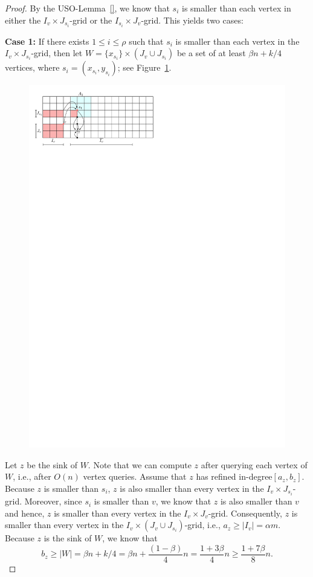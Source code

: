 \documentclass[a4paper,10pt]{article}
\newcommand{\indegree}{refined in-degree\xspace}
\begin{document}
\begin{proof}
By the USO-Lemma~\ref{}, we know that $s_i$ is smaller than each vertex in either the $I_v\times J_{s_i}$-grid or the $I_{s_i}\times J_v$-grid. This yields two cases:

\textbf{Case 1:} If there exists $1\leq i \leq \rho$ such that
$s_i$ is smaller than each vertex in the $I_v\times J_{s_i}$-grid, then let $W =  \{x_{s_i}\} \times (J_v\cup J_{s_i})$ be a set of at least $\beta n + k/4$ vertices, where $s_i = (x_{s_i}, y_{s_i})$; see Figure~\ref{fig:Expansion Case 1}. 

\begin{figure}[h]
\centering
\includegraphics{expansion_lemma_Case1.pdf}
\caption{\small }
\label{fig:Expansion Case 1}
\end{figure}

Let $z$ be the sink of $W$. Note that we can compute $z$ after querying each vertex of $W$, i.e., after $O(n)$ vertex queries. Assume that $z$ has \indegree $[a_z, b_z]$. 
Because $z$ is smaller than $s_i$, $z$ is also smaller than every vertex in the $I_v\times J_{s_i}$-grid. Moreover, since $s_i$ is smaller than $v$, we know that $z$ is also smaller than $v$ and hence, $z$ is smaller than every vertex in the $I_v\times J_v$-grid.
Consequently, $z$ is smaller than every vertex in the $I_v\times (J_v\cup J_{s_i})$-grid, i.e., $a_z\geq |I_v| = \alpha m$.
Because $z$ is the sink of $W$, we know that
 $$b_z \geq |W| = \beta n + k/4 = \beta n + \frac{(1-\beta)}{4}n = \frac{1 + 3\beta}{4}n\geq \frac{1 + 7\beta}{8}n.$$


\end{proof}
\end{document}
